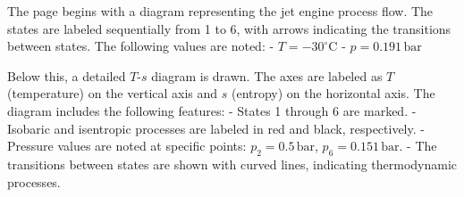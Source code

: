 The page begins with a diagram representing the jet engine process flow. The states are labeled sequentially from 1 to 6, with arrows indicating the transitions between states. The following values are noted:  
- \( T = -30^\circ\text{C} \)  
- \( p = 0.191 \, \text{bar} \)  

Below this, a detailed \( T \)-\( s \) diagram is drawn. The axes are labeled as \( T \) (temperature) on the vertical axis and \( s \) (entropy) on the horizontal axis. The diagram includes the following features:  
- States 1 through 6 are marked.  
- Isobaric and isentropic processes are labeled in red and black, respectively.  
- Pressure values are noted at specific points: \( p_2 = 0.5 \, \text{bar} \), \( p_6 = 0.151 \, \text{bar} \).  
- The transitions between states are shown with curved lines, indicating thermodynamic processes.